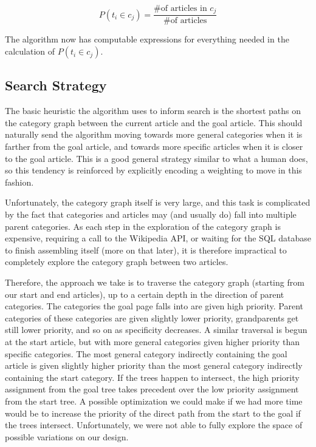 \documentclass{article}
\begin{document}
\[P(t_i \in c_j) = \frac{\text{\# of articles in } c_j}{\text{\# of articles}}\]

The algorithm now has computable expressions for everything needed in the
calculation of $P(t_i \in c_j)$. 

\subsection{Search Strategy}
The basic heuristic the algorithm uses to inform search is the shortest paths on
the category graph between the current article and the goal article. This should
naturally send the algorithm moving towards more general categories when it is
farther from the goal article, and towards more specific articles when it is
closer to the goal article. This is a good general strategy similar to what a
human does, so this tendency is reinforced by explicitly encoding a weighting to
move in this fashion.

Unfortunately, the category graph itself is very large, and this task is complicated
by the fact that categories and articles may (and usually do) fall into multiple parent categories.
As each step in the exploration of the category graph is expensive,
requiring a call to the Wikipedia API,
or waiting for the SQL database to finish assembling itself (more on that later),
it is therefore impractical to completely explore the category graph between two articles.

Therefore, the approach we take is to traverse the category graph
(starting from our start and end articles),
up to a certain depth in the direction of parent categories.
The categories the goal page falls into are given high priority.
Parent categories of these categories are given slightly lower priority,
grandparents get still lower priority, and so on as specificity decreases.
A similar traversal is begun at the start article,
but with more general categories given higher priority than specific categories.
The most general category indirectly containing the goal article is given slightly higher priority
than the most general category indirectly containing the start category.
If the trees happen to intersect, the high priority assignment from the goal tree
takes precedent over the low priority assignment from the start tree.
A possible optimization we could make if we had more time would be to increase the priority
of the direct path from the start to the goal if the trees intersect.
Unfortunately, we were not able to fully explore the space of possible variations on our design.
\end{document}
